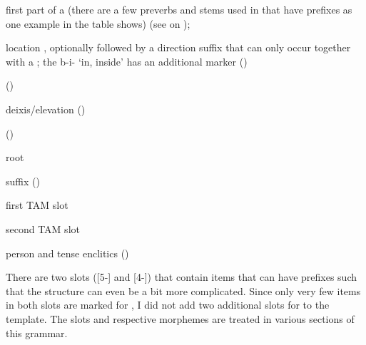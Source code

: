 \begin{description}[leftmargin=*]
	\item[5-]	first part of a  (there are a few preverbs and stems used in  that have  prefixes as one example in the table shows) (see  on ); 
	\item[4-]	location , optionally followed by a direction suffix that can only occur together with a ; the  b-i- `in, inside' has an additional  marker ()
	\item[3-]	 ()
	\item[2-]	deixis/elevation  ()
	\item[1-]	  ()
	\item[0]	root
	\item[-1]	 suffix ()
	\item[-2]	first TAM slot 
	\item[-3]	second TAM slot 
	\item[-4]	person and tense enclitics ()
\end{description}
%
There are two slots ([5-] and [4-]) that contain items that can have  prefixes such that the structure can even be a bit more complicated. Since only very few items in both slots are marked for , I did not add two additional slots for  to the template. The slots and respective morphemes are treated in various sections of this grammar.
%

